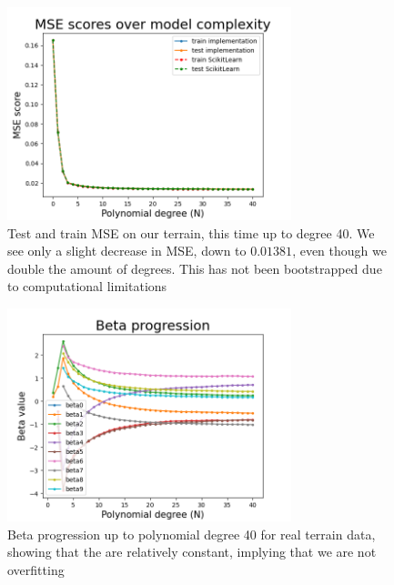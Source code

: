 \documentclass[twocolumn,10pt,cleanfoot]{asme2ej}
\begin{document}
\begin{figure}
\centerline{\includegraphics[width=3.25in]{figure/realOLSmse40.png}}
\caption{Test and train MSE on our terrain, this time up to degree 40. We see only a slight decrease in MSE, down to $0.01381$, even though we double the amount of degrees. This has not been bootstrapped due to computational limitations}
\label{realOLSmse40}
\end{figure}

\begin{figure}
\centerline{\includegraphics[width=3.25in]{figure/realOLSbetaprog40.png}}
\caption{Beta progression up to polynomial degree 40 for real terrain data, showing that the are relatively constant, implying that we are not overfitting}
\label{realOLSbetaprog40}
\end{figure}
\end{document}
